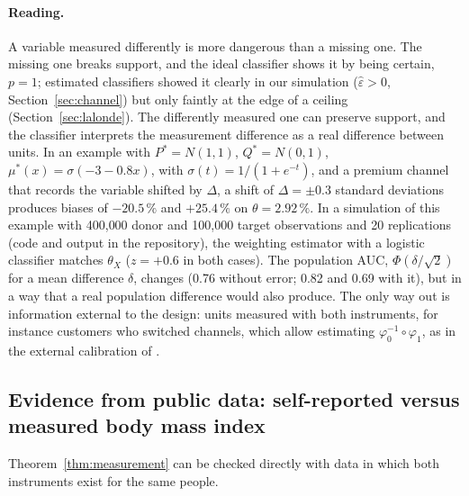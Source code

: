 \documentclass[11pt,a4paper]{article}
\theoremstyle{plain}
\theoremstyle{definition}
\begin{document}
\paragraph{Reading.} A variable measured differently is more dangerous than a missing one. The missing one breaks support, and the ideal classifier shows it by being certain, $p=1$; estimated classifiers showed it clearly in our simulation ($\hat\varepsilon>0$, Section~\ref{sec:channel}) but only faintly at the edge of a ceiling (Section~\ref{sec:lalonde}). The differently measured one can preserve support, and the classifier interprets the measurement difference as a real difference between units. In an example with $P^*=N(1,1)$, $Q^*=N(0,1)$, $\mu^*(x)=\sigma(-3-0.8x)$, with $\sigma(t)=1/(1+e^{-t})$, and a premium channel that records the variable shifted by $\Delta$, a shift of $\Delta=\pm0.3$ standard deviations produces biases of $-20.5\,\%$ and $+25.4\,\%$ on $\theta=2.92\,\%$. In a simulation of this example with 400{,}000 donor and 100{,}000 target observations and 20 replications (code and output in the repository), the weighting estimator with a logistic classifier matches $\theta_X$ ($z=+0.6$ in both cases). The population AUC, $\Phi(\delta/\sqrt2)$ for a mean difference $\delta$, changes (0.76 without error; 0.82 and 0.69 with it), but in a way that a real population difference would also produce. The only way out is information external to the design: units measured with both instruments, for instance customers who switched channels, which allow estimating $\varphi_0^{-1}\circ\varphi_1$, as in the external calibration of \citet{webbvargas2017}.

\subsection{Evidence from public data: self-reported versus measured body mass index}\label{sec:nhanes}

Theorem~\ref{thm:measurement} can be checked directly with data in which both instruments exist for the same people.
\end{document}
